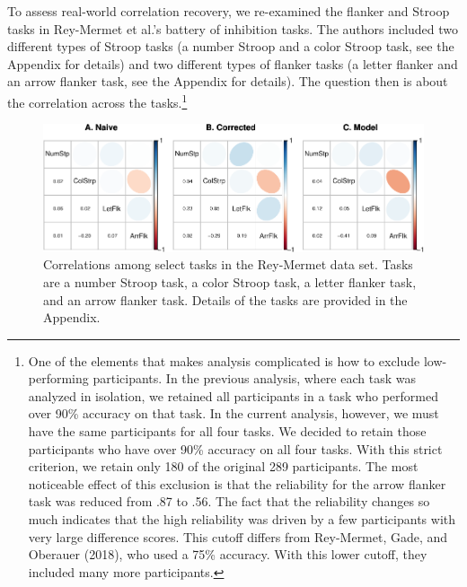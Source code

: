 \documentclass[
  english,
  ,man]{apa6}
\begin{document}
To assess real-world correlation recovery, we re-examined the flanker and Stroop tasks in Rey-Mermet et al.'s battery of inhibition tasks. The authors included two different types of Stroop tasks (a number Stroop and a color Stroop task, see the Appendix for details) and two different types of flanker tasks (a letter flanker and an arrow flanker task, see the Appendix for details). The question then is about the correlation across the tasks.\footnote{One of the elements that makes analysis complicated is how to exclude low-performing participants. In the previous analysis, where each task was analyzed in isolation, we retained all participants in a task who performed over 90\% accuracy on that task. In the current analysis, however, we must have the same participants for all four tasks. We decided to retain those participants who have over 90\% accuracy on all four tasks. With this strict criterion, we retain only 180 of the original 289 participants. The most noticeable effect of this exclusion is that the reliability for the arrow flanker task was reduced from .87 to .56. The fact that the reliability changes so much indicates that the high reliability was driven by a few participants with very large difference scores. This cutoff differs from Rey-Mermet, Gade, and Oberauer (2018), who used a 75\% accuracy. With this lower cutoff, they included many more participants.}

\begin{figure}
\centering
\includegraphics{p_files/figure-latex/rm4task-1.pdf}
\caption{\label{fig:rm4task}Correlations among select tasks in the Rey-Mermet data set. Tasks are a number Stroop task, a color Stroop task, a letter flanker task, and an arrow flanker task. Details of the tasks are provided in the Appendix.}
\end{figure}
\end{document}
